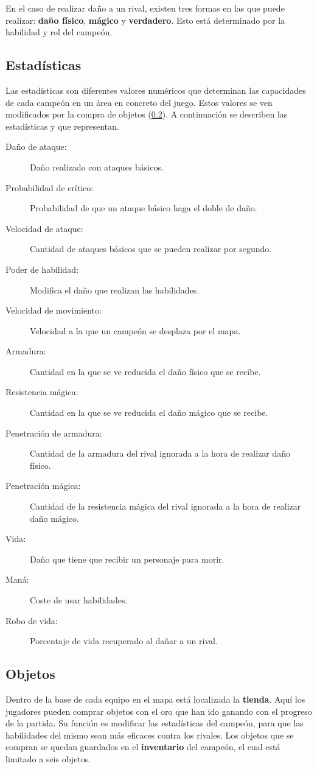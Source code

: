 En el caso de realizar daño a un rival, existen tres formas en las que puede realizar: \textbf{daño físico}, \textbf{mágico} y \textbf{verdadero}. Esto está determinado por la habilidad y rol del campeón.

\subsection{Estadísticas}
\label{estadisticas}
Las estadísticas son diferentes valores numéricos que determinan las capacidades de cada campeón en un área en concreto del juego. Estos valores se ven modificados por la compra de objetos (\ref{objetos}). A continuación se describen las estadísticas y que representan.
\begin{description}
	\item[Daño de ataque:] Daño realizado con ataques básicos.
	\item[Probabilidad de crítico:] Probabilidad de que un ataque básico haga el doble de daño.
	\item[Velocidad de ataque:] Cantidad de ataques básicos que se pueden realizar por segundo.
	\item[Poder de habilidad:] Modifica el daño que realizan las habilidades.
	\item[Velocidad de movimiento:] Velocidad a la que un campeón se desplaza por el mapa.
	\item[Armadura:] Cantidad en la que se ve reducida el daño físico que se recibe.
	\item[Resistencia mágica:] Cantidad en la que se ve reducida el daño mágico que se recibe.
	\item[Penetración de armadura:] Cantidad de la armadura del rival ignorada a la hora de realizar daño físico.
	\item[Penetración mágica:] Cantidad de la resistencia mágica del rival ignorada a la hora de realizar daño mágico.
	\item[Vida:] Daño que tiene que recibir un personaje para morir.
	\item[Maná:] Coste de usar habilidades.
	\item[Robo de vida:] Porcentaje de vida recuperado al dañar a un rival.
\end{description}

\subsection{Objetos}
\label{objetos}
Dentro de la base de cada equipo en el mapa está localizada la \textbf{tienda}. Aquí los jugadores pueden comprar objetos con el oro que han ido ganando con el progreso de la partida. Su función es modificar las estadísticas del campeón, para que las habilidades del mismo sean más eficaces contra los rivales. Los objetos que se compran se quedan guardados en el \textbf{inventario} del campeón, el cual está limitado a seis objetos.

